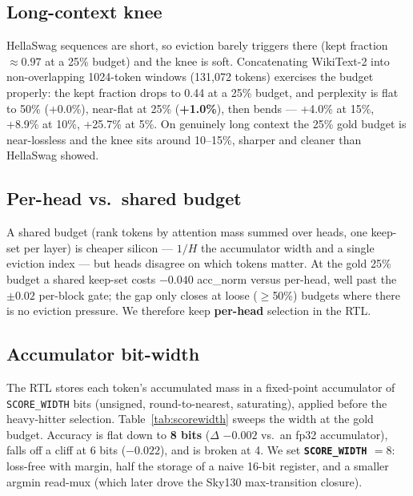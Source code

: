 \documentclass[10pt,twocolumn]{article}
\begin{document}
\subsection{Long-context knee}

HellaSwag sequences are short, so eviction barely triggers there (kept fraction
$\approx0.97$ at a 25\% budget) and the knee is soft. Concatenating WikiText-2 into
non-overlapping 1024-token windows (131{,}072 tokens) exercises the budget
properly: the kept fraction drops to 0.44 at a 25\% budget, and perplexity is flat
to 50\% (+0.0\%), near-flat at 25\% (\textbf{+1.0\%}), then bends --- +4.0\% at
15\%, +8.9\% at 10\%, +25.7\% at 5\%. On genuinely long context the 25\% gold
budget is near-lossless and the knee sits around 10--15\%, sharper and cleaner than
HellaSwag showed.

\subsection{Per-head vs.\ shared budget}

A shared budget (rank tokens by attention mass summed over heads, one keep-set per
layer) is cheaper silicon --- $1/H$ the accumulator width and a single eviction
index --- but heads disagree on which tokens matter. At the gold 25\% budget a
shared keep-set costs $-0.040$ acc\_norm versus per-head, well past the $\pm0.02$
per-block gate; the gap only closes at loose ($\ge$50\%) budgets where there is no
eviction pressure. We therefore keep \textbf{per-head} selection in the RTL.

\subsection{Accumulator bit-width}
\label{sec:scorewidth}

The RTL stores each token's accumulated mass in a fixed-point accumulator of
\texttt{SCORE\_WIDTH} bits (unsigned, round-to-nearest, saturating), applied
before the heavy-hitter selection. Table~\ref{tab:scorewidth} sweeps the width at
the gold budget. Accuracy is flat down to \textbf{8 bits} ($\Delta$ $-0.002$ vs.\
an fp32 accumulator), falls off a cliff at 6 bits ($-0.022$), and is broken at 4.
We set \textbf{\texttt{SCORE\_WIDTH} $=8$}: loss-free with margin, half the storage
of a naive 16-bit register, and a smaller argmin read-mux (which later drove the
Sky130 max-transition closure).
\end{document}
